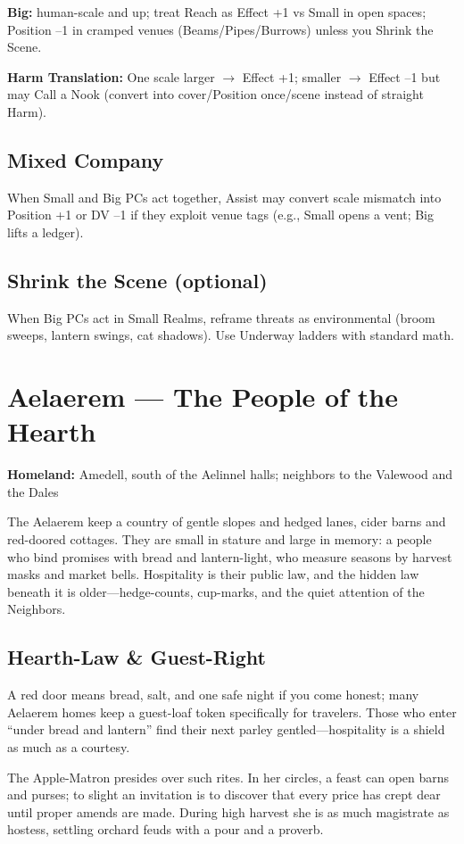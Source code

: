 \documentclass[11pt,letterpaper]{article}
\newcommand{\playmode}[1]{\subsection*{#1}}
\begin{document}
\textbf{Big:} human-scale and up; treat Reach as Effect +1 vs Small in open spaces; Position --1 in cramped venues (Beams/Pipes/Burrows) unless you Shrink the Scene.

\textbf{Harm Translation:} One scale larger $\rightarrow$ Effect +1; smaller $\rightarrow$ Effect --1 but may Call a Nook (convert into cover/Position once/scene instead of straight Harm).

\playmode{Mixed Company}
When Small and Big PCs act together, Assist may convert scale mismatch into Position +1 or DV --1 if they exploit venue tags (e.g., Small opens a vent; Big lifts a ledger).

\playmode{Shrink the Scene (optional)}
When Big PCs act in Small Realms, reframe threats as environmental (broom sweeps, lantern swings, cat shadows). Use Underway ladders with standard math.


\section{Aelaerem --- The People of the Hearth}

\textbf{Homeland:} Amedell, south of the Aelinnel halls; neighbors to the Valewood and the Dales

The Aelaerem keep a country of gentle slopes and hedged lanes, cider barns and red-doored cottages. They are small in stature and large in memory: a people who bind promises with bread and lantern-light, who measure seasons by harvest masks and market bells. Hospitality is their public law, and the hidden law beneath it is older---hedge-counts, cup-marks, and the quiet attention of the Neighbors.

\subsection*{Hearth-Law \& Guest-Right}

A red door means bread, salt, and one safe night if you come honest; many Aelaerem homes keep a guest-loaf token specifically for travelers. Those who enter ``under bread and lantern'' find their next parley gentled---hospitality is a shield as much as a courtesy.

The Apple-Matron presides over such rites. In her circles, a feast can open barns and purses; to slight an invitation is to discover that every price has crept dear until proper amends are made. During high harvest she is as much magistrate as hostess, settling orchard feuds with a pour and a proverb.
\end{document}
